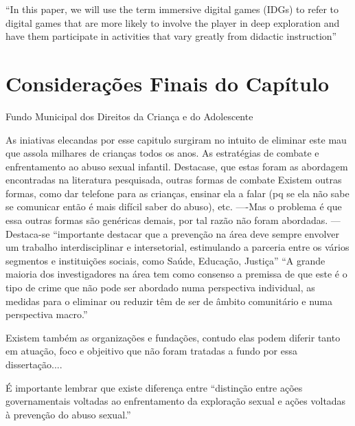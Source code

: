 ``In this paper, we will use the term immersive digital games (IDGs) to refer to digital games that are more likely to involve the player in deep exploration and have them participate in activities that vary greatly from didactic instruction'' \cite{dip2016advancing}

\section{Considerações Finais do Capítulo}\label{sec:finais}


Fundo Municipal dos Direitos da Criança e do Adolescente%



As iniativas elecandas por esse capitulo surgiram no intuito de eliminar este mau que assola milhares de crianças todos os anos. As estratégias de combate e enfrentamento ao abuso sexual infantil. Destacase, que estas foram as abordagem encontradas na literatura pesquisada, outras formas de combate Existem outras formas, como dar telefone para as crianças, ensinar ela a falar (pq se ela não sabe se comunicar então é mais difícil saber do abuso), etc. ----Mas o problema é que essa outras formas são genéricas demais, por tal razão não foram abordadas.
---
Destaca-se ``importante  destacar  que  a  prevenção  na  área  deve  sempre  envolver  um trabalho interdisciplinar e intersetorial, estimulando a parceria entre os vários segmentos e instituições   sociais,   como   Saúde,   Educação,   Justiça'' \cite{pinto2017avaliaccao}
``A grande maioria dos investigadores na área tem como consenso a premissa de que este é o tipo de crime que não pode ser abordado numa perspectiva individual, as medidas para o eliminar ou reduzir têm de ser de âmbito comunitário e numa perspectiva macro.''\cite{maria2010papel}

Existem também as organizações e fundações, contudo elas podem diferir tanto em atuação, foco e objeitivo que não foram tratadas a fundo por essa dissertação....





É importante lembrar que existe diferença entre ``distinção entre ações governamentais voltadas ao enfrentamento da exploração sexual e ações voltadas à prevenção do abuso sexual.''  \cite{caccia2014conselheiros}


